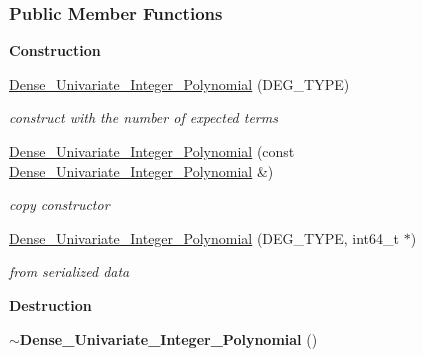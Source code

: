 \subsubsection*{Public Member Functions}
\begin{Indent}\textbf{ Construction}\par
\begin{DoxyCompactItemize}
\item 
\mbox{\label{group__polygroup_aefc915a9455b4f1512415c2a31a78eb5}} 
\hyperlink{group__polygroup_aefc915a9455b4f1512415c2a31a78eb5}{Dense\+\_\+\+Univariate\+\_\+\+Integer\+\_\+\+Polynomial} (D\+E\+G\+\_\+\+T\+Y\+PE)
\begin{DoxyCompactList}\small\item\em construct with the number of expected terms \end{DoxyCompactList}\item 
\mbox{\label{group__polygroup_a412c4aac4dbcf8512294e3ec1c7dd32f}} 
\hyperlink{group__polygroup_a412c4aac4dbcf8512294e3ec1c7dd32f}{Dense\+\_\+\+Univariate\+\_\+\+Integer\+\_\+\+Polynomial} (const \hyperlink{group__polygroup_class_dense___univariate___integer___polynomial}{Dense\+\_\+\+Univariate\+\_\+\+Integer\+\_\+\+Polynomial} \&)
\begin{DoxyCompactList}\small\item\em copy constructor \end{DoxyCompactList}\item 
\mbox{\label{group__polygroup_a7791b2856ef361875ba1a9f08700dcad}} 
\hyperlink{group__polygroup_a7791b2856ef361875ba1a9f08700dcad}{Dense\+\_\+\+Univariate\+\_\+\+Integer\+\_\+\+Polynomial} (D\+E\+G\+\_\+\+T\+Y\+PE, int64\+\_\+t $\ast$)
\begin{DoxyCompactList}\small\item\em from serialized data \end{DoxyCompactList}\end{DoxyCompactItemize}
\end{Indent}
\begin{Indent}\textbf{ Destruction}\par
\begin{DoxyCompactItemize}
\item 
\mbox{\label{group__polygroup_a9fb7da639b0155c4b6c5b2ee4e3f89fa}} 
{\bfseries $\sim$\+Dense\+\_\+\+Univariate\+\_\+\+Integer\+\_\+\+Polynomial} ()
\end{DoxyCompactItemize}
\end{Indent}
